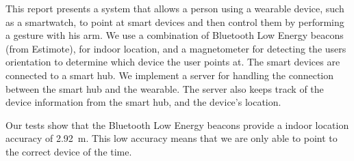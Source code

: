 This report presents a system that allows a person using a wearable device, such as a smartwatch, to point at smart devices and then control them by performing a gesture with his arm. We use a combination of Bluetooth Low Energy beacons (from Estimote), for indoor location, and a magnetometer for detecting the users orientation to determine which device the user points at. The smart devices are connected to a smart hub. We implement a server for handling the connection between the smart hub and the wearable. The server also keeps track of the device information from the smart hub, and the device's location.

Our tests show that the Bluetooth Low Energy beacons provide a indoor location accuracy of \SI{2.92}{\meter}. This low accuracy means that we are only able to point to the correct device  of the time. 